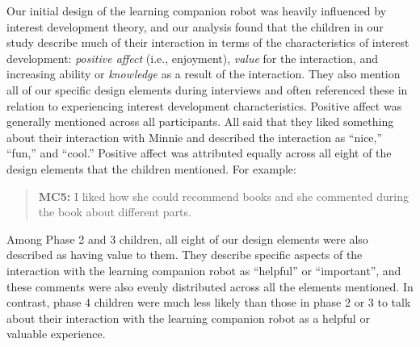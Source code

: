 \documentclass{sigchi}
\begin{document}
Our initial design of the learning companion robot was heavily influenced by interest development theory, and our analysis found that the children in our study describe much of their interaction in terms of the characteristics of interest development: \textit{positive affect} (i.e., enjoyment), \textit{value} for the interaction, and increasing ability or \textit{knowledge} as a result of the interaction. They also mention all of our specific design elements during interviews and often referenced these in relation to experiencing interest development characteristics. Positive affect was generally mentioned across all participants. All said that they liked something about their interaction with Minnie and described the interaction as ``nice,'' ``fun,'' and ``cool.'' Positive affect was attributed equally across all eight of the design elements that the children mentioned. For example:

	\begin{quote}
		\textbf{MC5:} I liked how she could recommend books and she commented during the book about different parts.
	\end{quote}
		
Among Phase 2 and 3 children, all eight of our design elements were also described as having value to them. They describe specific aspects of the interaction with the learning companion robot as ``helpful'' or ``important'', and these comments were also evenly distributed across all the elements mentioned. In contrast, phase 4 children were much less likely than those in phase 2 or 3 to talk about their interaction with the learning companion robot as a helpful or valuable experience. 
\end{document}

